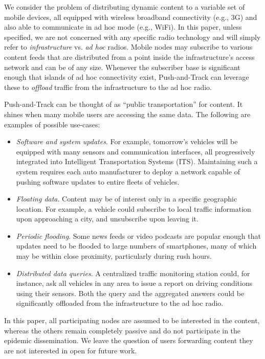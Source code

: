 \documentclass[preprint]{elsarticle}
\begin{document}
We consider the problem of distributing dynamic content to a variable set of mobile devices, all equipped with wireless broadband connectivity (e.g., 3G) and also able to communicate in ad hoc mode (e.g., WiFi). In this paper, unless specified, we are not concerned with any specific radio technology and will simply refer to \textit{infrastructure} vs. \textit{ad hoc} radios. Mobile nodes may subscribe to various content feeds that are distributed from a point inside the infrastructure's access network and can be of any size. Whenever the subscriber base is significant enough that islands of ad hoc connectivity exist, Push-and-Track can leverage these to \emph{offload} traffic from the infrastructure to the ad hoc radio.

Push-and-Track can be thought of as ``public transportation'' for content. It shines when many mobile users are accessing the same data. The following are examples of possible use-cases:
\begin{itemize}
\item \emph{Software and system updates}. For example, tomorrow's vehicles will be equipped with many sensors and communication interfaces, all progressively integrated into Intelligent Transportation Systems (ITS)\cite{etsi}. Maintaining such a system requires each auto manufacturer to deploy a network capable of pushing software updates to entire fleets of vehicles.
\item \emph{Floating data}. Content may be of interest only in a specific geographic location. For example, a vehicle could subscribe to local traffic information upon approaching a city, and unsubscribe upon leaving it.
\item \emph{Periodic flooding}. Some news feeds or video podcasts are popular enough that updates need to be flooded to large numbers of smartphones, many of which may be within close proximity, particularly during rush hours.
\item \emph{Distributed data queries}. A centralized traffic monitoring station could, for instance, ask all vehicles in any area to issue a report on driving conditions using their sensors. Both the query and the aggregated answers could be significantly offloaded from the infrastructure to the ad hoc radio.
\end{itemize}

In this paper, all participating nodes are assumed to be interested in the content, whereas the others remain completely passive and do not participate in the epidemic dissemination. We leave the question of users forwarding content they are not interested in open for future work.
\end{document}
